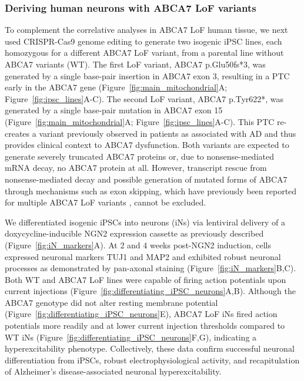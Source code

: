 \documentclass[12pt]{article}
\begin{document}
\subsubsection{Deriving human neurons with ABCA7 LoF variants}
To complement the correlative analyses in ABCA7 LoF human tissue, we next used CRISPR-Cas9 genome editing to generate two isogenic iPSC lines, each homozygous for a different ABCA7 LoF variant, from a parental line without ABCA7 variants (WT). The first LoF variant, ABCA7 p.Glu50fs*3, was generated by a single base-pair insertion in ABCA7 exon 3, resulting in a PTC early in the ABCA7 gene (Figure~\ref{fig:main_mitochondrial}A; Figure~\ref{fig:ipsc_lines}A-C). The second LoF variant, ABCA7 p.Tyr622*, was generated by a single base-pair mutation in ABCA7 exon 15 (Figure~\ref{fig:main_mitochondrial}A; Figure~\ref{fig:ipsc_lines}A-C). This PTC re-creates a variant previously observed in patients as associated with AD \cite{Steinberg2015-mu} and thus provides clinical context to ABCA7 dysfunction. Both variants are expected to generate severely truncated ABCA7 proteins or, due to nonsense-mediated mRNA decay, no ABCA7 protein at all. However, transcript rescue from nonsense-mediated decay and possible generation of mutated forms of ABCA7 through mechanisms such as exon skipping, which have previously been reported for multiple ABCA7 LoF variants \cite{De_Roeck2017-hv}, cannot be excluded.

We differentiated isogenic iPSCs into neurons (iNs) via lentiviral delivery of a doxycycline-inducible NGN2 expression cassette as previously described \cite{Ho2016-kz} (Figure~\ref{fig:iN_markers}A). At 2 and 4 weeks post-NGN2 induction, cells expressed neuronal markers TUJ1 and MAP2 and exhibited robust neuronal processes as demonstrated by pan-axonal staining (Figure~\ref{fig:iN_markers}B,C). Both WT and ABCA7 LoF lines were capable of firing action potentials upon current injections (Figure~\ref{fig:differentiating_iPSC_neurons}A,B). Although the ABCA7 genotype did not alter resting membrane potential (Figure~\ref{fig:differentiating_iPSC_neurons}E), ABCA7 LoF iNs fired action potentials more readily and at lower current injection thresholds compared to WT iNs (Figure~\ref{fig:differentiating_iPSC_neurons}F,G), indicating a hyperexcitability phenotype. Collectively, these data confirm successful neuronal differentiation from iPSCs, robust electrophysiological activity, and recapitulation of Alzheimer's disease-associated neuronal hyperexcitability.
\end{document}
